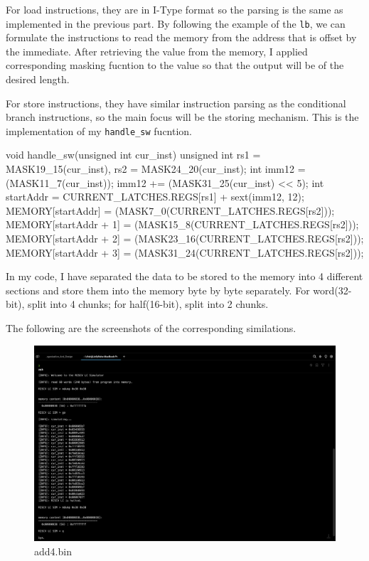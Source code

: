 \documentclass[12pt, a4paper]{article}
\begin{document}
\begin{ans}
For load instructions, they are in I-Type format so the parsing is the same as implemented in the previous part. 
By following the example of the \texttt{lb}, we can formulate the instructions to read the memory from the address that is offset by the immediate. 
After retrieving the value from the memory, I applied corresponding masking fucntion to the value so that the output will be of the desired length. 

For store instructions, they have similar instruction parsing as the conditional branch instructions, so the main focus will be the storing mechanism. 
This is the implementation of my \texttt{handle\_sw} fucntion. 

\begin{code}
void handle_sw(unsigned int cur_inst) {
    unsigned int rs1 = MASK19_15(cur_inst), rs2 = MASK24_20(cur_inst);
    int imm12 = (MASK11_7(cur_inst));
    imm12 += (MASK31_25(cur_inst) << 5);
    int startAddr = CURRENT_LATCHES.REGS[rs1] + sext(imm12, 12);
    MEMORY[startAddr] = (MASK7_0(CURRENT_LATCHES.REGS[rs2]));
    MEMORY[startAddr + 1] = (MASK15_8(CURRENT_LATCHES.REGS[rs2]));
    MEMORY[startAddr + 2] = (MASK23_16(CURRENT_LATCHES.REGS[rs2]));
    MEMORY[startAddr + 3] = (MASK31_24(CURRENT_LATCHES.REGS[rs2]));
}
\end{code}
In my code, I have separated the data to be stored to the memory into 4 different sections and store 
them into the memory byte by byte separately. For word(32-bit), split into 4 chunks; for half(16-bit), split into 2 chunks. 

\end{ans}
\pagebreak
The following are the screenshots of the corresponding similations. 
\begin{figure}[H]
    \caption{add4.bin}
    \includegraphics[width=1\linewidth]{../figs/add4.png}
\end{figure}
\end{document}
